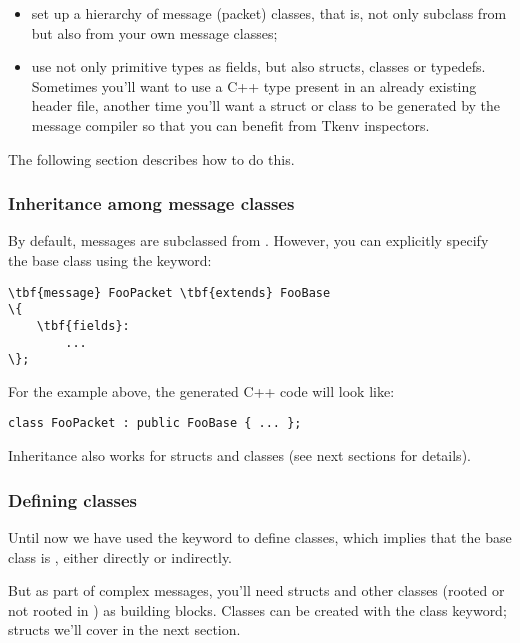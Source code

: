 \begin{itemize}
  \item set up a hierarchy of message (packet) classes, that is,
    not only subclass from  but also from your
    own message classes;
  \item use not only primitive types as fields, but also structs,
    classes or typedefs. Sometimes you'll want to use a C++ type
    present in an already existing header file, another time you'll
    want a struct or class to be generated by the message
    compiler so that you can benefit from Tkenv inspectors.
\end{itemize}

The following section describes how to do this.


\subsubsection{Inheritance among message classes}

By default, messages are subclassed from . However, you can
explicitly specify the base class using the  keyword:

\begin{Verbatim}[commandchars=\\\{\}]
\tbf{message} FooPacket \tbf{extends} FooBase
\{
    \tbf{fields}:
        ...
\};
\end{Verbatim}

For the example above, the generated C++ code will look like:

\begin{verbatim}
class FooPacket : public FooBase { ... };
\end{verbatim}

Inheritance also works for structs and classes (see next sections
for details).



\subsubsection{Defining classes}

Until now we have used the  keyword to define classes, which
implies that the base class is , either directly or indirectly.

But as part of complex messages, you'll need structs and other classes
(rooted or not rooted in ) as building blocks.
Classes can be created with the  class keyword;
structs we'll cover in the next section.

